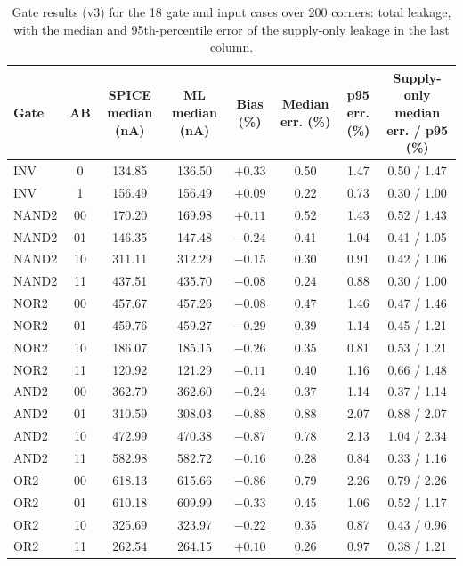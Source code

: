 \documentclass[12pt, a4paper]{article}
\begin{document}
\begin{table}[H]
\centering
\scriptsize
\begin{tabularx}{\linewidth}{|>{\raggedright\arraybackslash}p{1.0cm}|c|C|C|C|C|C|C|}
\hline
\textbf{Gate} & \textbf{AB} & \textbf{SPICE median (nA)} & \textbf{ML median (nA)} & \textbf{Bias (\%)} & \textbf{Median err. (\%)} & \textbf{p95 err. (\%)} & \textbf{Supply-only median err. / p95 (\%)} \\
\hline
INV & 0 & 134.85 & 136.50 & $+0.33$ & 0.50 & 1.47 & 0.50 / 1.47 \\
\hline
INV & 1 & 156.49 & 156.49 & $+0.09$ & 0.22 & 0.73 & 0.30 / 1.00 \\
\hline
NAND2 & 00 & 170.20 & 169.98 & $+0.11$ & 0.52 & 1.43 & 0.52 / 1.43 \\
\hline
NAND2 & 01 & 146.35 & 147.48 & $-0.24$ & 0.41 & 1.04 & 0.41 / 1.05 \\
\hline
NAND2 & 10 & 311.11 & 312.29 & $-0.15$ & 0.30 & 0.91 & 0.42 / 1.06 \\
\hline
NAND2 & 11 & 437.51 & 435.70 & $-0.08$ & 0.24 & 0.88 & 0.30 / 1.00 \\
\hline
NOR2 & 00 & 457.67 & 457.26 & $-0.08$ & 0.47 & 1.46 & 0.47 / 1.46 \\
\hline
NOR2 & 01 & 459.76 & 459.27 & $-0.29$ & 0.39 & 1.14 & 0.45 / 1.21 \\
\hline
NOR2 & 10 & 186.07 & 185.15 & $-0.26$ & 0.35 & 0.81 & 0.53 / 1.21 \\
\hline
NOR2 & 11 & 120.92 & 121.29 & $-0.11$ & 0.40 & 1.16 & 0.66 / 1.48 \\
\hline
AND2 & 00 & 362.79 & 362.60 & $-0.24$ & 0.37 & 1.14 & 0.37 / 1.14 \\
\hline
AND2 & 01 & 310.59 & 308.03 & $-0.88$ & 0.88 & 2.07 & 0.88 / 2.07 \\
\hline
AND2 & 10 & 472.99 & 470.38 & $-0.87$ & 0.78 & 2.13 & 1.04 / 2.34 \\
\hline
AND2 & 11 & 582.98 & 582.72 & $-0.16$ & 0.28 & 0.84 & 0.33 / 1.16 \\
\hline
OR2 & 00 & 618.13 & 615.66 & $-0.86$ & 0.79 & 2.26 & 0.79 / 2.26 \\
\hline
OR2 & 01 & 610.18 & 609.99 & $-0.33$ & 0.45 & 1.06 & 0.52 / 1.17 \\
\hline
OR2 & 10 & 325.69 & 323.97 & $-0.22$ & 0.35 & 0.87 & 0.43 / 0.96 \\
\hline
OR2 & 11 & 262.54 & 264.15 & $+0.10$ & 0.26 & 0.97 & 0.38 / 1.21 \\
\hline
\end{tabularx}
\caption{Gate results (v3) for the 18 gate and input cases over 200 corners: total leakage, with the median and 95th-percentile error of the supply-only leakage in the last column.}
\label{tab:g3}
\end{table}
\end{document}
